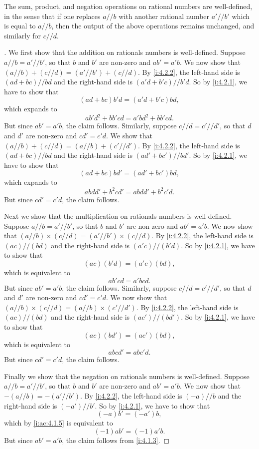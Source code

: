 \begin{lem}\label{i:4.2.3}
  The sum, product, and negation operations on rational numbers are well-defined, in the sense that if one replaces \(a // b\) with another rational number \(a' // b'\) which is equal to \(a // b\), then the output of the above operations remains unchanged, and similarly for \(c // d\).
\end{lem}

\begin{proof}[]
  We first show that the addition on rationals numbers is well-defined.
  Suppose \(a // b = a' // b'\), so that \(b\) and \(b'\) are non-zero and \(ab' = a'b\).
  We now show that \((a // b) + (c // d) = (a' // b') + (c // d)\).
  By \cref{i:4.2.2}, the left-hand side is \((ad + bc) // bd\) and the right-hand side is \((a'd + b'c) // b'd\).
  So by \cref{i:4.2.1}, we have to show that
  \[
    (ad + bc)b'd = (a'd + b'c)bd,
  \]
  which expands to
  \[
    ab'd^2 + bb'cd = a'bd^2 + bb'cd.
  \]
  But since \(ab' = a'b\), the claim follows.
  Similarly, suppose \(c // d = c' // d'\), so that \(d\) and \(d'\) are non-zero and \(cd' = c'd\).
  We show that \((a // b) + (c // d) = (a // b) + (c' // d')\).
  By \cref{i:4.2.2}, the left-hand side is \((ad + bc) // bd\) and the right-hand side is \((ad' + bc') // bd'\).
  So by \cref{i:4.2.1}, we have to show that
  \[
    (ad + bc)bd' = (ad' + bc')bd,
  \]
  which expands to
  \[
    abdd' + b^2cd' = abdd' + b^2c'd.
  \]
  But since \(cd' = c'd\), the claim follows.

  Next we show that the multiplication on rationals numbers is well-defined.
  Suppose \(a // b = a' // b'\), so that \(b\) and \(b'\) are non-zero and \(ab' = a'b\).
  We now show that \((a // b) \times (c // d) = (a' // b') \times (c // d)\).
  By \cref{i:4.2.2}, the left-hand side is \((ac) // (bd)\) and the right-hand side is \((a'c) // (b'd)\).
  So by \cref{i:4.2.1}, we have to show that
  \[
    (ac)(b'd) = (a'c)(bd),
  \]
  which is equivalent to
  \[
    ab'cd = a'bcd.
  \]
  But since \(ab' = a'b\), the claim follows.
  Similarly, suppose \(c // d = c' // d'\), so that \(d\) and \(d'\) are non-zero and \(cd' = c'd\).
  We now show that \((a // b) \times (c // d) = (a // b) \times (c' // d')\).
  By \cref{i:4.2.2}, the left-hand side is \((ac) // (bd)\) and the right-hand side is \((ac') // (bd')\).
  So by \cref{i:4.2.1}, we have to show that
  \[
    (ac)(bd') = (ac')(bd),
  \]
  which is equivalent to
  \[
    abcd' = abc'd.
  \]
  But since \(cd' = c'd\), the claim follows.

  Finally we show that the negation on rationals numbers is well-defined.
  Suppose \(a // b = a' // b'\), so that \(b\) and \(b'\) are non-zero and \(ab' = a'b\).
  We now show that \(-(a // b) = -(a' // b')\).
  By \cref{i:4.2.2}, the left-hand side is \((-a) // b\) and the right-hand side is \((-a') // b'\).
  So by \cref{i:4.2.1}, we have to show that
  \[
    (-a)b' = (-a')b,
  \]
  which by \cref{i:ac:4.1.5} is equivalent to
  \[
    (-1)ab' = (-1)a'b.
  \]
  But since \(ab' = a'b\), the claim follows from \cref{i:4.1.3}.
\end{proof}

